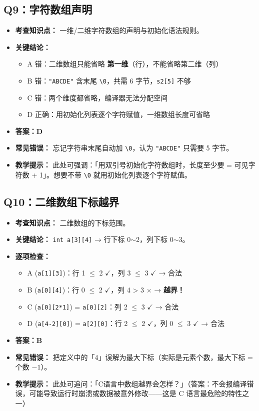 \subsection{Q9：字符数组声明}

\begin{itemize}
    \item \textbf{考查知识点：} 一维/二维字符数组的声明与初始化语法规则。
    \item \textbf{关键结论：}
    \begin{itemize}
        \item A 错：二维数组只能省略 \textbf{第一维}（行），不能省略第二维（列）
        \item B 错：\texttt{"ABCDE"} 含末尾 \texttt{\textbackslash 0}，共需 6 字节，\texttt{s2[5]} 不够
        \item C 错：两个维度都省略，编译器无法分配空间
        \item D 正确：用初始化列表逐个字符赋值，一维数组长度可省略
    \end{itemize}
    \item {\color{highlight}\textbf{答案：D}}
    \item \textbf{常见错误：} 忘记字符串末尾自动加 \texttt{\textbackslash 0}，认为 \texttt{"ABCDE"} 只需要 5 字节。
    \item \textbf{教学提示：} 此处可强调：「用双引号初始化字符数组时，长度至少要 = 可见字符数 + 1」。想要不带 \texttt{\textbackslash 0} 就用初始化列表逐个字符赋值。
\end{itemize}

\subsection{Q10：二维数组下标越界}

\begin{itemize}
    \item \textbf{考查知识点：} 二维数组的下标范围。
    \item \textbf{关键结论：} \texttt{int a[3][4]} → 行下标 0$\sim$2，列下标 0$\sim$3。
    \item \textbf{逐项检查：}
    \begin{itemize}
        \item A (\texttt{a[1][3]})：行 1 $\leq$ 2 $\checkmark$，列 3 $\leq$ 3 $\checkmark$ → 合法
        \item B (\texttt{a[0][4]})：行 0 $\leq$ 2 $\checkmark$，列 4 > 3 $\times$ → \textbf{越界！}
        \item C (\texttt{a[0][2*1]}) = \texttt{a[0][2]}：列 2 $\leq$ 3 $\checkmark$ → 合法
        \item D (\texttt{a[4-2][0]}) = \texttt{a[2][0]}：行 2 $\leq$ 2 $\checkmark$，列 0 $\leq$ 3 $\checkmark$ → 合法
    \end{itemize}
    \item {\color{highlight}\textbf{答案：B}}
    \item \textbf{常见错误：} 把定义中的「4」误解为最大下标（实际是元素个数，最大下标 = 个数 $- 1$）。
    \item \textbf{教学提示：} 此处可追问：「C语言中数组越界会怎样？」（答案：不会报编译错误，可能导致运行时崩溃或数据被意外修改——这是 C 语言最危险的特性之一）
\end{itemize}

